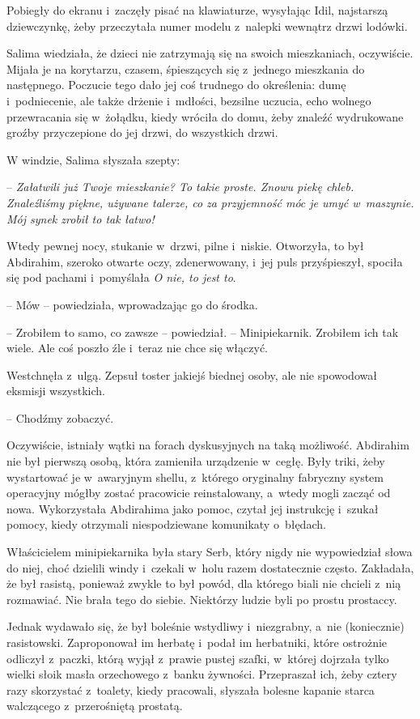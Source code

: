\documentclass[oneside,polish,11pt,sfheadings]{mwbk}
\begin{document}
Pobiegły do ekranu i~zaczęły pisać na klawiaturze, wysyłając Idil,
najstarszą dziewczynkę, żeby przeczytała numer modelu z~nalepki wewnątrz
drzwi lodówki.

Salima wiedziała, że dzieci nie zatrzymają się na swoich mieszkaniach,
oczywiście. Mijała je na korytarzu, czasem, śpieszących się z~jednego
mieszkania do następnego. Poczucie tego dało jej coś trudnego do
określenia: dumę i~podniecenie, ale także drżenie i~mdłości, bezsilne
uczucia, echo wolnego przewracania się w~żołądku, kiedy wróciła do domu,
żeby znaleźć wydrukowane groźby przyczepione do jej drzwi, do wszystkich
drzwi.

W windzie, Salima słyszała szepty: 

-- \textit{Załatwili już Twoje
mieszkanie? To takie proste. Znowu piekę chleb. Znaleźliśmy piękne,
używane talerze, co za przyjemność móc je umyć w~maszynie. Mój synek
zrobił to tak łatwo!}

Wtedy pewnej nocy, stukanie w~drzwi, pilne i~niskie. Otworzyła, to był
Abdirahim, szeroko otwarte oczy, zdenerwowany, i~jej puls przyśpieszył,
spociła się pod pachami i~pomyślała \textit{O nie, to jest to}.

-- Mów -- powiedziała, wprowadzając go do środka.

-- Zrobiłem to samo, co zawsze -- powiedział. -- Minipiekarnik. Zrobiłem
ich tak wiele. Ale coś poszło źle i~teraz nie chce się włączyć.

Westchnęła z~ulgą. Zepsuł toster jakiejś biednej osoby, ale nie
spowodował eksmisji wszystkich. 

-- Chodźmy zobaczyć.

Oczywiście, istniały wątki na forach dyskusyjnych na taką możliwość.
Abdirahim nie był pierwszą osobą, która zamieniła urządzenie w~cegłę.
Były triki, żeby wystartować je w~awaryjnym shellu, z~którego oryginalny
fabryczny system operacyjny mógłby zostać pracowicie reinstalowany, a~wtedy mogli zacząć od nowa. Wykorzystała Abdirahima jako pomoc, czytał
jej instrukcję i~szukał pomocy, kiedy otrzymali niespodziewane
komunikaty o~błędach.

Właścicielem minipiekarnika była stary Serb, który nigdy nie
wypowiedział słowa do niej, choć dzielili windy i~czekali w~holu razem
dostatecznie często. Zakładała, że był rasistą, ponieważ zwykle to był
powód, dla którego biali nie chcieli z~nią rozmawiać. Nie brała tego do
siebie. Niektórzy ludzie byli po prostu prostaccy.

Jednak wydawało się, że był boleśnie wstydliwy i~niezgrabny, a~nie
(koniecznie) rasistowski. Zaproponował im herbatę i~podał im herbatniki,
które ostrożnie odliczył z~paczki, którą wyjął z~prawie pustej szafki, w~której dojrzała tylko wielki słoik masła orzechowego z~banku żywności.
Przepraszał ich, żeby cztery razy skorzystać z~toalety, kiedy pracowali,
słyszała bolesne kapanie starca walczącego z~przerośniętą prostatą.
\end{document}
